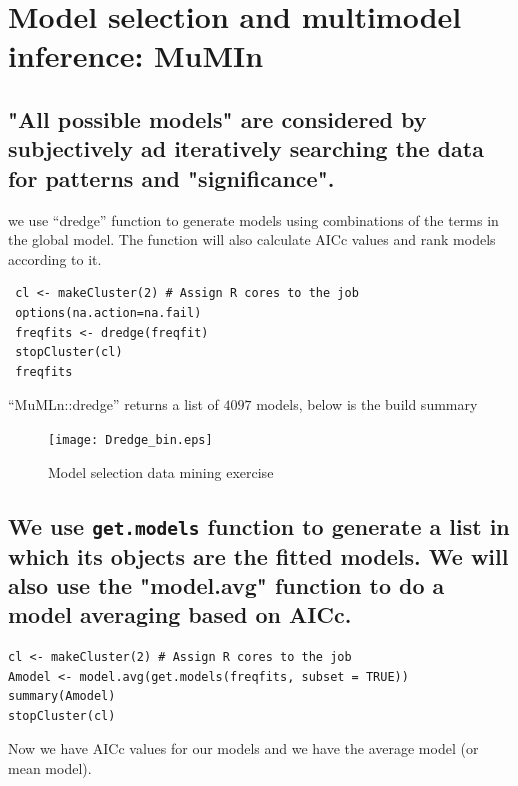 \documentclass{DissertateUSU}
\begin{document}
\section{Model selection and multimodel inference: MuMIn}
\label{sec:Model selection and multimodel inference: MuMIn}

\singlespace

\subsection{"All possible models" are considered by subjectively ad iteratively searching the data for patterns and "significance".}
\label{ssec:Data_mining}

we use ``dredge'' function to generate models using combinations of the
terms in the global model. The function will also calculate AICc values
and rank models according to it.

\small

\begin{verbatim}
 cl <- makeCluster(2) # Assign R cores to the job
 options(na.action=na.fail)
 freqfits <- dredge(freqfit)
 stopCluster(cl)
 freqfits
\end{verbatim}

\normalsize

``MuMLn::dredge'' returns a list of \(4097\) models, below is the build
summary

\begin{figure}
\centering
\texttt{[image: Dredge\_bin.eps]}
\caption[Data dredging]{Model selection data mining exercise}
\label{Dredge}
\end{figure}

\subsection{We use \texttt{get.models} function to generate a list in which its objects are the fitted models. We will also use the "model.avg" function to do a model averaging based on AICc.}
\label{sec:Model averaging function}

\small

\begin{verbatim}
cl <- makeCluster(2) # Assign R cores to the job 
Amodel <- model.avg(get.models(freqfits, subset = TRUE))
summary(Amodel)
stopCluster(cl) 
\end{verbatim}

\normalsize

Now we have AICc values for our models and we have the average model (or
mean model).
\end{document}

